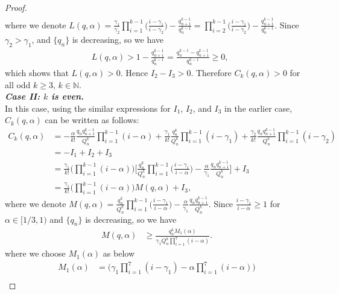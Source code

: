 \documentclass[10pt,a4paper]{amsart}
\begin{document}
\begin{proof}
\begin{align*}
\end{align*}where we denote $L(q,\alpha)=\frac{\gamma_{1}}{\gamma_{2}}\displaystyle\prod_{i=1}^{k-1}
\big(\frac{i-\gamma_{1}}{i-\gamma_{2}}\big)-\frac{q_{n+1}^{k-1}}{q_{n}^{k-1}}=\displaystyle\prod_{i=2}^{k-1}
\big(\frac{i-\gamma_{1}}{i-\gamma_{2}}\big)-\frac{q_{n+1}^{k-1}}{q_{n}^{k-1}}$. Since $\gamma_2>\gamma_1$, and $\{q_n\}$ is decreasing, so we have
\begin{align*}
&L(q,\alpha)>1-\frac{q_{n+1}^{k-1}}{q_{n}^{k-1}}=\frac{q_{n}^{k-1}-q_{n+1}^{k-1}}{q_{n}^{k-1}}\geq 0,
\end{align*}
which shows that $L(q,\alpha)>0$. Hence $I_{2}-I_{3}>0$. Therefore $C_{k}(q,\alpha)>0$ for all odd $k\geq3$, $k\in\mathbb{N}$.\\
\emph{\textbf{Case II: $k$ is even.}}\\
In this case, using the similar expressions for $I_1$, $I_2$, and $I_3$ in the earlier case, $C_{k}(q,\alpha)$ can be written as follows:
\begin{align*}
C_{k}(q,\alpha)&=-\frac{\alpha}{k!}\frac{q_{n}q_{n+1}^{k-1}}{Q_{n}^{k}}\displaystyle\prod_{i=1}^{k-1}(i-\alpha)+
\frac{\gamma_{1}}{k!}\frac{q_{n}^{k}}{Q_{n}^{k}}\displaystyle\prod_{i=1}^{k-1}(i-\gamma_{1})+
\frac{\gamma_{2}}{k!}\frac{q_{n}q_{n+1}^{k-1}}{Q_{n}^{k}}\displaystyle\prod_{i=1}^{k-1}(i-\gamma_{2})\\
&=-I_{1}+I_{2}+I_{3}\\
&=\frac{\gamma_{1}}{k!}\Big(\displaystyle\prod_{i=1}^{k-1}(i-\alpha)\Big)\Big[\frac{q_{n}^{k}}{Q_{n}^{k}}\displaystyle\prod_{i=1}^{k-1}\big(\frac{i-\gamma_{1}}{i-\alpha}\big)-
\frac{\alpha}{\gamma_{1}}\frac{q_{n}q_{n+1}^{k-1}}{Q_{n}^{k}}\Big]+I_{3}\\
&=\frac{\gamma_{1}}{k!}\Big(\displaystyle\prod_{i=1}^{k-1}(i-\alpha)\Big)M(q,\alpha)+I_{3},
\end{align*}where we denote $M(q,\alpha)=\frac{q_{n}^{k}}{Q_{n}^{k}}\displaystyle\prod_{i=1}^{k-1}\big(\frac{i-\gamma_{1}}{i-\alpha}\big)-\frac{\alpha}{\gamma_{1}}\frac{q_{n}q_{n+1}^{k-1}}{Q_{n}^{k}}$. Since $\frac{i-\gamma_{1}}{i-\alpha}\geq1$ for $\alpha\in[1/3,1)$ and $\{q_{n}\}$ is decreasing, so we have
\begin{align*}
M(q,\alpha)& \geq\frac{q_{n}^{k}M_{1}(\alpha)}{\gamma_{1}Q_{n}^{k}\displaystyle\prod_{i=1}^{7}(i-\alpha)}.
\end{align*}
where we choose $M_{1}(\alpha)$ as below
\begin{align*}
M_{1}(\alpha)&=\Big(\gamma_{1}\displaystyle\prod_{i=1}^{7}(i-\gamma_{1})-\alpha\displaystyle\prod_{i=1}^{7}(i-\alpha)\Big)\\

\end{align*}
\end{proof}
\end{document}
